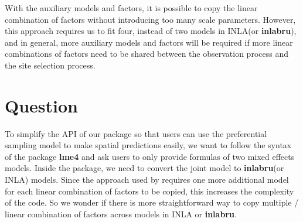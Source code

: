 \documentclass{article}
\begin{document}
With the auxiliary models and factors, it is possible to copy the linear combination of factors 
without introducing too many scale parameters. 
However, this approach requires us to fit four, instead of two models in INLA(or \textbf{inlabru}), 
and in general, more auxiliary models and factors will be required if more linear combinations 
of factors need to be shared between the observation process and the site selection process.

\section{Question}
To simplify the API of our package so that users can use the preferential sampling model to 
make spatial predictions easily, we want to follow the syntax of the package \textbf{lme4} and 
ask users to only provide formulas of two mixed effects models. Inside the package, we need to 
convert the joint model to \textbf{inlabru}(or INLA) models.  Since the approach used by 
\cite{Watson2019_pref_samp} requires one more additional model for each linear combination 
of factors to be copied, this increases the complexity of the code. So we wonder if there is more
straightforward way to copy multiple / linear combination of factors  across models in INLA or 
\textbf{inlabru}.
	


\end{document}

